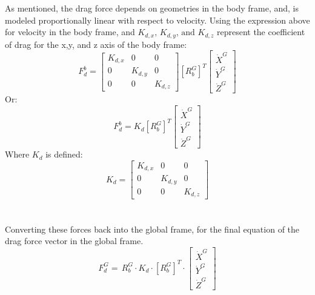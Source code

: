 \documentclass[conf]{new-aiaa}
\begin{document}
\noindent As mentioned, the drag force depends on geometries in the body frame, and, is modeled proportionally linear with respect to velocity. Using the expression above for velocity in the body frame, and $K_{d,x},\,K_{d,y},\,\text{and }K_{d,z}$ represent the coefficient of drag for the x,y, and z axis of the body frame:
$$F_d^b =\begin{bmatrix}
    K_{d,x}&0&0\\0&K_{d,y}&0\\0&0&K_{d,z}
\end{bmatrix}[R_b^G]^T \begin{bmatrix}\dot{X}^G\\\dot{Y}^G\\\dot{Z}^G \end{bmatrix} $$
\noindent Or:
$$F_d^b =K_d[R_b^G]^T \begin{bmatrix}\dot{X}^G\\\dot{Y}^G\\\dot{Z}^G \end{bmatrix} $$
\noindent Where $K_d$ is defined:
\begin{equation} K_d =\begin{bmatrix}
    K_{d,x}&0&0\\0&K_{d,y}&0\\0&0&K_{d,z}
\end{bmatrix}\label{eq:K_d}
\end{equation}\\
\\\noindent Converting these forces back into the global frame, for the final equation of the drag force vector in the global frame. 
\begin{equation*}
    \boxed{F_d^G =\,R_b^G\cdot K_d\cdot[R_b^G]^T \cdot \begin{bmatrix}\dot{X}^G\\\dot{Y}^G\\\dot{Z}^G \end{bmatrix}}
    \label{eq:F_d^G}
\end{equation*}
\end{document}
